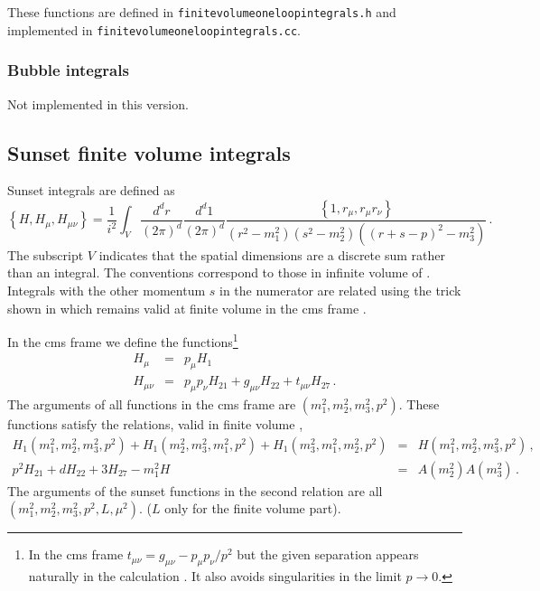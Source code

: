\documentclass[12pt,a4paper]{article}
\begin{document}
These functions are defined in \texttt{finitevolumeoneloopintegrals.h}
and implemented in \texttt{finitevolumeoneloopintegrals.cc}.

\subsubsection{Bubble integrals}

Not implemented in this version.

\subsection{Sunset finite volume integrals}

Sunset integrals are defined as
\begin{equation}
\label{defsunset}
\left\{H,H_\mu,H_{\mu\nu}\right\} =
\frac{1}{i^2}\int_V\frac{d^d r}{(2\pi)^d}\frac{d^d 1}{(2\pi)^d}
\frac{\left\{1,r_\mu,r_\mu r_\nu\right\}}
{\left(r^2-m_1^2\right)\left(s^2-m_2^2\right)\left((r+s-p)^2-m_3^2\right)}\,.
\end{equation}
The subscript $V$ indicates that the spatial dimensions are a discrete
sum rather than an integral.
The conventions correspond to those in infinite volume of
\cite{Amoros:1999dp}.
Integrals with the other momentum $s$ in the numerator are related
using the trick shown in \cite{Amoros:1999dp} which remains
valid at finite volume in the cms frame \cite{Bijnens:2013doa}.

In the cms frame we define the functions\footnote{In the cms frame
$t_{\mu\nu}= g_{\mu\nu}-p_\mu p_\nu/p^2$ but the given separation
appears naturally in the calculation \cite{Bijnens:2013doa}. It also avoids
singularities in the limit $p\to0$.}
\begin{eqnarray}
\label{defHi}
H_\mu &=& p_\mu H_1\,
\\\nonumber
H_{\mu\nu} &=& p_\mu p_\nu H_{21} + g_{\mu\nu} H_{22} + t_{\mu\nu} H_{27}\,.
\end{eqnarray}
The arguments of all functions in the cms frame are
$(m_1^2,m_2^2,m_3^2,p^2)$.
These functions satisfy the relations, valid in finite
volume \cite{Bijnens:2013doa},
\begin{eqnarray}
\label{Hrelations}
H_1(m_1^2,m_2^2,m_3^2,p^2)+
H_1(m_2^2,m_3^2,m_1^2,p^2)+
H_1(m_3^2,m_1^2,m_2^2,p^2)
&=& H(m_1^2,m_2^2,m_3^2,p^2)\,,
\nonumber\\
p^2 H_{21}+d H_{22} + 3 H_{27}-m_1^2 H &=& A(m_2^2)A(m_3^2)\,.
\end{eqnarray}
The arguments of the sunset functions in the second relation are
all $(m_1^2,m_2^2,m_3^2,p^2,L,\mu^2)$. ($L$ only for the finite volume part).
\end{document}
